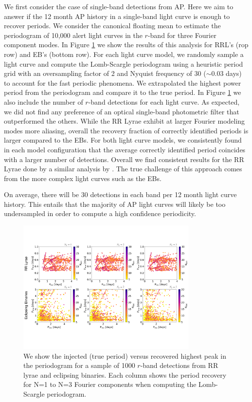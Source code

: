 \documentclass[DM,authoryear,toc]{lsstdoc}
\begin{document}
We first consider the case of single-band detections from AP. Here we aim to answer if the 12 month AP history in a single-band light curve is enough to recover periods. We consider the canonical floating mean to estimate the periodogram of 10,000 alert light curves in the $r$-band for three Fourier component modes. In Figure \ref{fig:single_band_lsp} we show the results of this analysis for RRL's (rop row) and EB's (bottom row). For each light curve model, we randomly sample a light curve and compute the Lomb-Scargle periodogram using a heuristic period grid with an oversampling factor of 2 and Nyquist frequency of 30 ($\sim$0.03 days) to account for the fast periodic phenomena. We extrapolated the highest power period from the periodogram and compare it to the true period. In Figure \ref{fig:single_band_lsp} we also include the number of $r$-band detections for each light curve. As expected, we did not find any preference of an optical single-band photometric filter that outperformed the others. While the RR Lyrae exhibit at larger Fourier modeling modes more aliasing, overall the recovery fraction of correctly identified periods is larger compared to the EBs. For both light curve models, we consistently found in each model configuration that the average correctly identified period coincides with a larger number of detections. Overall we find consistent results for the RR Lyrae done by a similar analysis by \citet{VanderPlas:VP2015}. The true challenge of this approach comes from the more complex light curves such as the EBs. 


On average, there will be 30 detections in each band per 12 month light curve history. This entails that the majority of AP light curves will likely be too undersampled in order to compute a high confidence periodicity. 


\begin{figure}
  \includegraphics[width=0.8\textwidth]{figures/singleband_lsp.pdf}
  \centering 
  \caption{We show the injected (true period) versus recovered highest peak in the periodogram for a sample of 1000 $r$-band detections from RR lyrae and eclipsing binaries. Each column shows the period recovery for N=1 to N=3 Fourier components when computing the Lomb-Scargle periodogram.}
  \label{fig:single_band_lsp}
\end{figure}
\end{document}
